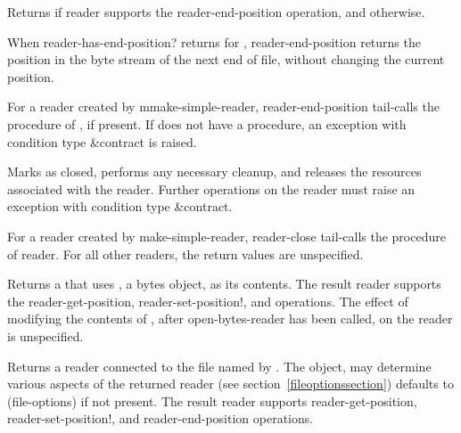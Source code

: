 \begin{entry}{%
}
   
Returns \schtrue{} if reader supports the {\cf reader-end-position}
operation, and \schfalse{} otherwise.
\end{entry}   

\begin{entry}{%
}
   
When {\cf reader-has-end-position?} returns \schtrue{} for ,
{\cf reader-end-position}
returns the position in the byte stream of the next end of file,
without changing the current position.
   
For a reader created by {\cf mmake-simple-reader}, {\cf reader-end-position} tail-calls the
 procedure of , if present. If
 does not have a  procedure, an
exception with condition type {\cf\&contract} is raised.
\end{entry}

\begin{entry}{%
}
   
Marks  as closed, performs any necessary cleanup, and
releases the resources associated with the reader. Further operations
on the reader must raise an exception with condition type
{\cf\&contract}.
   
For a reader created by {\cf make-simple-reader}, {\cf reader-close} tail-calls the
 procedure of reader.  For all other readers, the return
values are unspecified.
\end{entry}

\begin{entry}{%
}

Returns a  that uses 
, a bytes object, as its contents. The result reader supports
the {\cf reader-get-position}, {\cf reader-set-position!}, and 
operations.
The effect of modifying the contents of , after 
{\cf open-bytes-reader} has been called, on the reader is unspecified.
\end{entry}

\begin{entry}{%
}
   
Returns a reader connected to the file named by .
The  object, may determine various aspects of the returned reader
(see section~\ref{fileoptionssection}) defaults to {\cf (file-options)} if not
present.
The result reader supports {\cf reader-get-position},
{\cf reader-set-position!}, and {\cf reader-end-position} operations.
\end{entry} 

